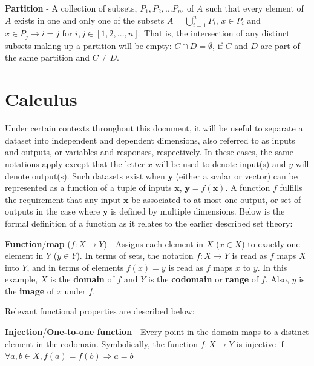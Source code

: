 \begin{defn}
  \textbf{Partition} - A collection of subsets, ${P_1, P_2, ... P_n}$, of $A$ such that every element of $A$ exists in one and only one of the subsets $A = \bigcup_{i=1}^{n} P_i$, $x \in P_i$ and $x \in P_j \rightarrow i = j$ for $i,j \in [1, 2, ..., n]$.
  That is, the intersection of any distinct subsets making up a partition will be empty: $C \cap D = \emptyset$, if $C$ and $D$ are part of the same partition and $C \neq D$.
\end{defn}

\section{Calculus}

Under certain contexts throughout this document, it will be useful to separate a dataset into independent and dependent dimensions, also referred to as inputs and outputs, or variables and responses, respectively.
%
In these cases, the same notations apply except that the letter $x$ will be used to denote input(s) and $y$ will denote output(s).
%
Such datasets exist when $\mathbf{y}$ (either a scalar or vector) can be represented as a function of a tuple of inputs $\mathbf{x}$, $\mathbf{y}=f(\mathbf{x})$.
%
A function $f$ fulfills the requirement that any input $\mathbf{x}$ be associated to at most one output, or set of outputs in the case where $\mathbf{y}$ is defined by multiple dimensions.
%
Below is the formal definition of a function as it relates to the earlier described set theory:

\begin{defn}
  \textbf{Function}/\textbf{map} ($f : X \rightarrow Y$) - Assigns each
  element in $X$ ($x \in X$) to exactly one element in $Y$ ($y \in Y$).
  In terms of sets, the notation $f : X \rightarrow Y$ is read as $f$
  maps $X$ into $Y$, and in terms of elements $f(x)=y$ is read as $f$ maps $x$
  to $y$.
  In this example, $X$ is the \textbf{domain} of $f$ and $Y$ is the
  \textbf{codomain} or \textbf{range} of $f$. Also, $y$ is the \textbf{image}
  of $x$ under $f$.
\end{defn}

Relevant functional properties are described below:

\begin{defn}
  \textbf{Injection}/\textbf{One-to-one function} - Every point in the domain
  maps to a distinct element in the codomain. Symbolically, the function
  $f:X\rightarrow Y$ is injective if $\forall a,b\in X,f(a)=f(b)\Rightarrow a=b$
\end{defn}

